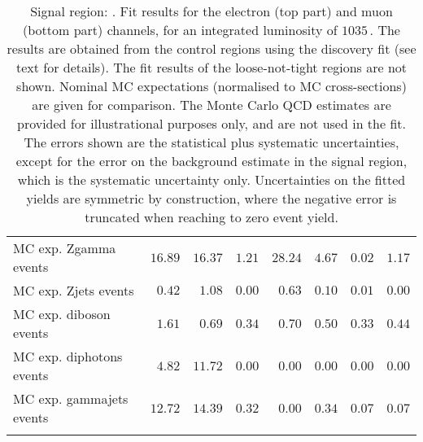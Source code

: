 \begin{table}
\begin{center}
{\begin{tabular*}{\textwidth}{@{\extracolsep{\fill}}lrrrrrrr}
        MC exp. Zgamma events         & $16.89$          & $16.37$          & $1.21$          & $28.24$          & $4.67$          & $0.02$          & $1.17$              \\
        MC exp. Zjets events         & $0.42$          & $1.08$          & $0.00$          & $0.63$          & $0.10$          & $0.01$          & $0.00$              \\
        MC exp. diboson events         & $1.61$          & $0.69$          & $0.34$          & $0.70$          & $0.50$          & $0.33$          & $0.44$              \\
        MC exp. diphotons events         & $4.82$          & $11.72$          & $0.00$          & $0.00$          & $0.00$          & $0.00$          & $0.00$              \\
        MC exp. gammajets events         & $12.72$          & $14.39$          & $0.32$          & $0.00$          & $0.34$          & $0.07$          & $0.07$              \\
\noalign{\smallskip}\hline\noalign{\smallskip}
\end{tabular*}
}
\end{center}
\caption{Signal region: . Fit results for the electron (top part) and muon (bottom part) channels, for an integrated luminosity of $1035$\,\ipb.
The results are obtained from the control regions using the discovery fit (see text for details). The fit results of the loose-not-tight regions are not shown.
Nominal MC expectations (normalised to MC cross-sections) are given for comparison. 
The Monte Carlo QCD estimates are provided for illustrational purposes only, and are not used in the fit.
The errors shown are the statistical plus systematic uncertainties, except for the error on the background estimate in the signal region, which is the systematic uncertainty only.
Uncertainties on the fitted yields are symmetric by construction, 
where the negative error is truncated when reaching to zero event yield.
}
\label{table.results.systematics.in.logL.fit.table.results.yields}
\end{table}
%